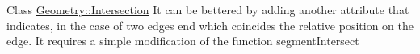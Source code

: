 \label{todo__todo000001}
\hypertarget{todo__todo000001}{}
 
\begin{DoxyDescription}
\item[Class \hyperlink{structGeometry_1_1Intersection}{Geometry::Intersection} ]It can be bettered by adding another attribute that indicates, in the case of two edges end which coincides the relative position on the edge. It requires a simple modification of the function segmentIntersect 
\end{DoxyDescription}